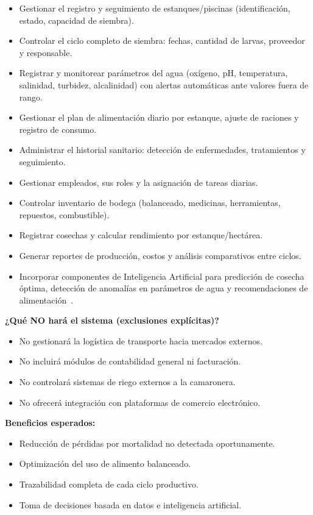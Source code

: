 \documentclass[11pt,a4paper]{article}
\begin{document}
\begin{itemize}
    \item Gestionar el registro y seguimiento de estanques/piscinas (identificación, estado, capacidad de siembra).
    \item Controlar el ciclo completo de siembra: fechas, cantidad de larvas, proveedor y responsable.
    \item Registrar y monitorear parámetros del agua (oxígeno, pH, temperatura, salinidad, turbidez, alcalinidad) con alertas automáticas ante valores fuera de rango.
    \item Gestionar el plan de alimentación diario por estanque, ajuste de raciones y registro de consumo.
    \item Administrar el historial sanitario: detección de enfermedades, tratamientos y seguimiento.
    \item Gestionar empleados, sus roles y la asignación de tareas diarias.
    \item Controlar inventario de bodega (balanceado, medicinas, herramientas, repuestos, combustible).
    \item Registrar cosechas y calcular rendimiento por estanque/hectárea.
    \item Generar reportes de producción, costos y análisis comparativos entre ciclos.
    \item Incorporar componentes de Inteligencia Artificial para predicción de cosecha óptima, detección de anomalías en parámetros de agua y recomendaciones de alimentación~\cite{ref2}.
\end{itemize}

\textbf{¿Qué NO hará el sistema (exclusiones explícitas)?}

\begin{itemize}
    \item No gestionará la logística de transporte hacia mercados externos.
    \item No incluirá módulos de contabilidad general ni facturación.
    \item No controlará sistemas de riego externos a la camaronera.
    \item No ofrecerá integración con plataformas de comercio electrónico.
\end{itemize}

\textbf{Beneficios esperados:}

\begin{itemize}
    \item Reducción de pérdidas por mortalidad no detectada oportunamente.
    \item Optimización del uso de alimento balanceado.
    \item Trazabilidad completa de cada ciclo productivo.
    \item Toma de decisiones basada en datos e inteligencia artificial.
\end{itemize}
\end{document}
